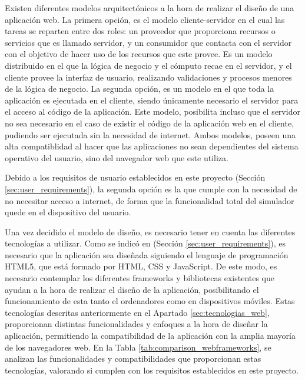 Existen diferentes modelos arquitectónicos a la hora de realizar el diseño de una aplicación web. La primera opción, es el modelo cliente-servidor en el cual las tareas se reparten entre dos roles: un proveedor que proporciona recursos o servicios que es llamado servidor, y un consumidor que contacta con el servidor con el objetivo de hacer uso de los recursos que este provee. Es un modelo distribuido en el que la lógica de negocio y el cómputo recae en el servidor, y el cliente provee la interfaz de usuario, realizando validaciones y procesos menores de la lógica de negocio. La segunda opción, es un modelo en el que toda la aplicación es ejecutada en el cliente, siendo únicamente necesario el servidor para el acceso al código de la aplicación. Este modelo, posibilita incluso que el servidor no sea necesario en el caso de existir el código de la aplicación web en el cliente, pudiendo ser ejecutada sin la necesidad de internet. Ambos modelos, poseen una alta compatiblidad al hacer que las aplicaciones no sean dependientes del sistema operativo del usuario, sino del navegador web que este utiliza.

Debido a los requisitos de usuario establecidos en este proyecto (Sección \ref{sec:user_requirements}), la segunda opción es la que cumple con la necesidad de no necesitar acceso a internet, de forma que la funcionalidad total del simulador quede en el dispositivo del usuario.

Una vez decidido el modelo de diseño, es necesario tener en cuenta las diferentes tecnologías a utilizar. Como se indicó en (Sección \ref{sec:user_requirements}), es necesario que la aplicación sea diseñada siguiendo el lenguaje de programación HTML5, que está formado por HTML, CSS y JavaScript. De este modo, es necesario contemplar los diferentes frameworks y bibliotecas existentes que ayudan a la hora de realizar el diseño de la aplicación, posibilitando el funcionamiento de esta tanto el ordenadores como en dispositivos móviles. Estas tecnologías descritas anteriormente en el Apartado \ref{sec:tecnologias_web}, proporcionan distintas funcionalidades y enfoques a la hora de diseñar la aplicación, permitiendo la compatibilidad de la aplicación con la amplia mayoría de los navegadores web. En la Tabla \ref{tab:comparison_webframeworks}, se analizan las funcionalidades y compatibilidades que proporcionan estas tecnologías, valorando si cumplen con los requisitos establecidos en este proyecto.


